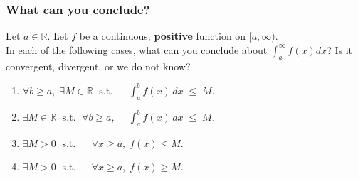\documentclass[14pt]{beamer}
\newcommand{\R}{\mathbb{R}}
\newcommand{\setsize}[1]{\fontsize{#1}{#1}\selectfont} %
\newcommand{\smallerfont}{\setsize{13}} %
\begin{document}
	\begin{frame}[t]
		\smallerfont
		\frametitle{What can you conclude?}

		Let $a \in \R$. Let $f$ be a continuous, {\bf positive} function on
		$[a, \infty)$. \\ In each of the following cases, what can you conclude
		about ${\displaystyle \int_a^{\infty} f(x) dx}$? \; Is it convergent,
		divergent, or we do not know?

		\begin{enumerate}
			\item ${\displaystyle \forall b \geq a, \; \exists M \in \R \; \mbox{ s.t. } \; \quad \int_a^b f(x)\,dx \; \leq \; M}$.

			\item ${\displaystyle \exists M \in \R \; \mbox{ s.t. } \; \forall b \geq a, \; \quad \int_a^b f(x)\, dx \; \leq \; M}$.
				\vspace{.3cm}

			\item ${\displaystyle \exists M >0 \; \mbox{ s.t. } \; \quad \forall x \geq a, \; f(x) \leq M}$.
				\vspace{.3cm}

			\item ${\displaystyle \exists M >0 \; \mbox{ s.t. } \; \quad \forall x \geq a, \; f(x) \geq M}$.
		\end{enumerate}
	\end{frame}
\end{document}
